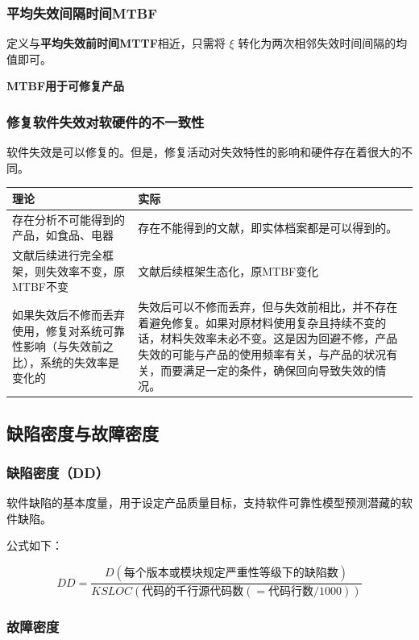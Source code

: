 \subsubsection{平均失效间隔时间MTBF}

定义与\textbf{平均失效前时间MTTF}相近，只需将 $\xi$ 转化为两次相邻失效时间间隔的均值即可。

\textbf{MTBF用于可修复产品}

\subsubsection{修复软件失效对软硬件的不一致性}

软件失效是可以修复的。但是，修复活动对失效特性的影响和硬件存在着很大的不同。

\begin{tabular}{|>{\raggedright\arraybackslash}p{8cm}|>{\raggedright\arraybackslash}p{8cm}|}
  \hline
  \textbf{理论} & \textbf{实际} \\
  \hline
  存在分析不可能得到的产品，如食品、电器 & 存在不能得到的文献，即实体档案都是可以得到的。 \\
  \hline
  文献后续进行完全框架，则失效率不变，原MTBF不变 & 文献后续框架生态化，原MTBF变化 \\
  \hline
  如果失效后不修而丢弃使用，修复对系统可靠性影响（与失效前之比），系统的失效率是变化的 & 失效后可以不修而丢弃，但与失效前相比，并不存在着避免修复。如果对原材料使用复杂且持续不变的话，材料失效率未必不变。这是因为回避不修，产品失效的可能与产品的使用频率有关，与产品的状况有关，而要满足一定的条件，确保回向导致失效的情况。 \\
  \hline
\end{tabular}

\subsection{缺陷密度与故障密度}

\subsubsection{缺陷密度（DD）}

软件缺陷的基本度量，用于设定产品质量目标，支持软件可靠性模型预测潜藏的软件缺陷。

公式如下：

\[
DD = \frac{D(\text{每个版本或模块规定严重性等级下的缺陷数})}{KSLOC(\text{代码的千行源代码数}(=\text{代码行数}/1000))}
\]

\subsubsection{故障密度}

